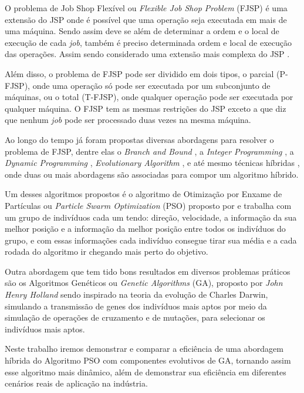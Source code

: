     O problema de Job Shop Flexível ou \textit{Flexible Job Shop Problem} (FJSP) é uma extensão do JSP onde é possível que uma operação seja executada em mais de uma máquina. Sendo assim deve se além de determinar a ordem e o local de execução de cada \textit{job}, também é preciso determinada ordem e local de execução das operações. Assim sendo considerado uma extensão mais complexa do JSP \cite{Jansen2000}. \newline

    Além disso, o problema de FJSP pode ser dividido em dois tipos, o parcial (P-FJSP), onde uma operação só pode ser executada por um subconjunto de máquinas, ou o total (T-FJSP), onde qualquer operação pode ser executada por qualquer máquina. O FJSP tem as mesmas restrições do JSP exceto a que diz que nenhum \textit{job} pode ser processado duas vezes na mesma máquina. \newline

    Ao longo do tempo já foram propostas diversas abordagens para resolver o problema de FJSP, dentre elas o \textit{Branch and Bound} \cite{Nababan2008}, a 
    \textit{Integer Programming} \cite{Pan2007}, a 
    \textit{Dynamic Programming} \cite{Gromicho2012}, 
    \textit{Evolutionary Algorithm} \cite{Pezzella2008}, e até mesmo técnicas híbridas \cite{Zhang2009}, onde duas ou mais abordagens são associadas para compor um algoritmo híbrido. \newline

    Um desses algoritmos propostos é o algoritmo de Otimização por Enxame de Partículas ou \textit{Particle Swarm Optimization} (PSO) proposto por \cite{Kennedy1995} e trabalha com um grupo de indivíduos cada um tendo: direção, velocidade, a informação da sua melhor posição e a informação da melhor posição entre todos os indivíduos do grupo, e com essas informações cada indivíduo consegue tirar sua média e a cada rodada do algoritmo ir chegando mais perto do objetivo. \newline

    Outra abordagem que tem tido bons resultados em diversos problemas práticos \cite{Qing2012} são os Algoritmos Genéticos ou \textit{Genetic Algorithms} (GA), proposto por \textit{John Henry Holland} sendo inspirado na teoria da evolução de Charles Darwin, simulando a transmissão de genes dos indivíduos mais aptos por meio da simulação de operações de cruzamento e de mutações, para selecionar os indivíduos mais aptos. \newline

    Neste trabalho iremos demonstrar e comparar a eficiência de uma abordagem híbrida do Algoritmo PSO com componentes evolutivos de GA, tornando assim esse algoritmo mais dinâmico, além de demonstrar sua eficiência em diferentes cenários reais de aplicação na indústria.\newline

